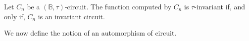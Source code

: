 \documentclass[../paper.tex]{subfiles}
\begin{document}
\begin{lem}
  Let $C_n$ be a $(\mathbb{B}, \tau)$-circuit. The function computed by $C_n$ is
  $\tau$-invariant if, and only if, $C_n$ is an invariant circuit.
\end{lem}



We now define the notion of an automorphism of circuit.
\end{document}
